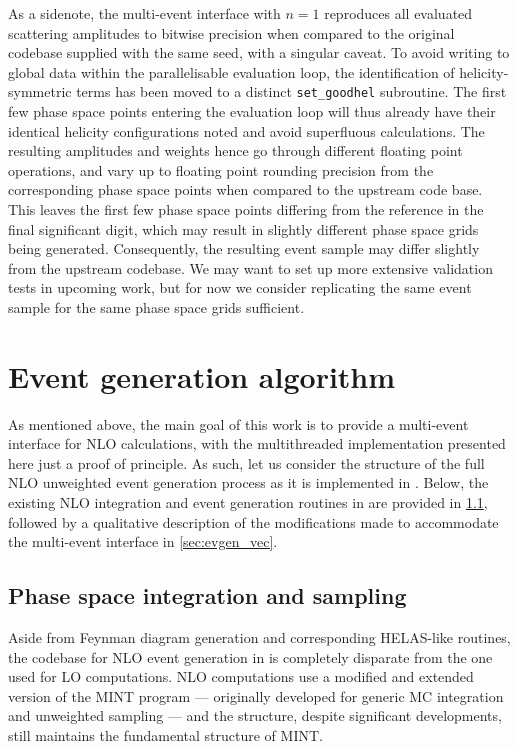 \documentclass[a4paper,11pt]{article}
\begin{document}
As a sidenote, the multi-event interface with $n=1$  reproduces all evaluated scattering amplitudes to bitwise precision when compared to the original codebase supplied with the same seed, with a singular caveat. To avoid writing to global data within the parallelisable evaluation loop, the identification of helicity-symmetric terms has been moved to a distinct \texttt{set\_goodhel} subroutine. The first few phase space points entering the evaluation loop will thus already have their identical helicity configurations noted and avoid superfluous calculations. The resulting amplitudes and weights hence go through different floating point operations, and vary up to floating point rounding precision from the corresponding phase space points when compared to the upstream code base. This leaves the first few phase space points differing from the reference in the final significant digit, which may result in slightly different phase space grids being generated. Consequently, the resulting event sample may differ slightly from the upstream codebase. We may want to set up more extensive validation tests in upcoming work, but for now we consider replicating the same event sample for the same phase space grids sufficient.


\section{Event generation algorithm}
\label{sec:evgen_algo}


As mentioned above, the main goal of this work is to provide a multi-event interface for NLO calculations, with the multithreaded implementation presented here just a proof of principle. As such, let us consider the structure of the full NLO unweighted event generation process as it is implemented in \mg{}. Below, the existing NLO integration and event generation routines in \mg{} are provided in 
\cref{sec:evgen_seq}, followed by a qualitative description of the modifications made to accommodate the multi-event interface in \cref{sec:evgen_vec}.


\subsection{Phase space integration and sampling}
\label{sec:evgen_seq}


Aside from Feynman diagram generation and corresponding HELAS-like routines, the codebase for NLO event generation in \mg{} is completely disparate from the one used for LO computations. NLO computations use a modified and extended version of the MINT program \cite{Nason:2007vt} --- originally developed for generic MC integration and unweighted sampling --- and the structure, despite significant developments, still maintains the fundamental structure of MINT.
\end{document}
